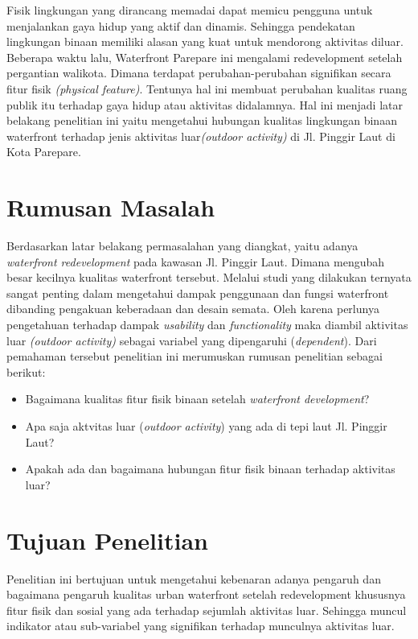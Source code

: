 \documentclass[../projects/thesis.tex]{subfiles}
\begin{document}
Fisik lingkungan yang dirancang memadai dapat memicu pengguna untuk menjalankan gaya hidup yang aktif dan dinamis\citep{chang2020}. Sehingga pendekatan lingkungan binaan memiliki alasan yang kuat untuk mendorong aktivitas diluar.
Beberapa waktu lalu, Waterfront Parepare ini mengalami redevelopment setelah pergantian walikota. Dimana terdapat perubahan-perubahan signifikan secara fitur fisik \textit{(physical feature)}. Tentunya hal ini membuat perubahan kualitas ruang publik itu terhadap gaya hidup atau aktivitas didalamnya. Hal ini menjadi latar belakang penelitian ini yaitu mengetahui hubungan kualitas lingkungan binaan waterfront terhadap jenis aktivitas luar\textit{(outdoor activity)} di Jl. Pinggir Laut di Kota Parepare.





\section{Rumusan Masalah}
Berdasarkan latar belakang permasalahan yang diangkat, yaitu adanya \textit{waterfront redevelopment} pada kawasan Jl. Pinggir Laut. Dimana mengubah besar kecilnya kualitas waterfront tersebut. Melalui studi yang dilakukan ternyata sangat penting dalam mengetahui dampak penggunaan dan fungsi waterfront dibanding pengakuan keberadaan dan desain semata. Oleh karena perlunya pengetahuan terhadap dampak \textit{usability} dan \textit{functionality} maka diambil aktivitas luar \textit{(outdoor activity)} sebagai variabel yang dipengaruhi (\textit{dependent}). Dari pemahaman tersebut penelitian ini merumuskan rumusan penelitian sebagai berikut:


\begin{itemize}
	\item Bagaimana kualitas fitur fisik binaan setelah \textit{waterfront development}?
	\item Apa saja aktvitas luar (\textit{outdoor activity}) yang ada di tepi laut Jl. Pinggir Laut?
	\item Apakah ada dan bagaimana hubungan fitur fisik binaan terhadap aktivitas luar?
\end{itemize}

\section{Tujuan Penelitian}
Penelitian ini bertujuan untuk mengetahui kebenaran adanya pengaruh dan bagaimana pengaruh kualitas urban waterfront setelah redevelopment khususnya fitur fisik dan sosial yang ada terhadap sejumlah aktivitas luar. Sehingga muncul indikator atau sub-variabel yang signifikan terhadap munculnya aktivitas luar.
\end{document}
